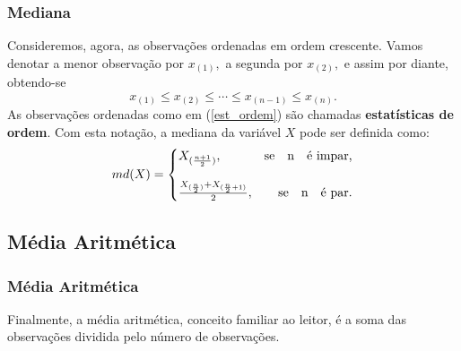 \documentclass[14pt,aspectratio=1610]{beamer}
\begin{document}
\begin{frame}{}
\frametitle{Mediana}
\begin{block}{}
\justifying
Consideremos, agora, as observações ordenadas em ordem crescente. Vamos denotar a
menor observação por $x_{(1)},$ a segunda por $x_{(2)},$ e assim por diante, obtendo-se
\begin{equation}\label{est_ordem}
x_{(1)}\leq x_{(2)}\leq \cdots \leq x_{(n-1)}\leq x_{(n)}.
\end{equation}
As observações ordenadas como em (\ref{est_ordem}) são chamadas {\bf estatísticas de ordem}. Com esta notação, a mediana da variável $X$ pode ser definida como:
\[
md(X)=\left\{
\setlength\arraycolsep{0pt}
\begin{array}{lr}
X_{(\frac{n+1}{2})},                                             &\quad \textrm{se}\quad $n$\quad \textrm{é impar,}\\
&\\
\frac{X_{(\frac{n}{2})}+X_{(\frac{n}{2}+1)}}{2},  &\quad \textrm{se}\quad $n$\quad \textrm{é par.}\\
\end{array}
\right.
\]
\end{block}
\end{frame}
\subsection{Média Aritmética}
\begin{frame}{}
\frametitle{Média Aritmética}
\begin{block}{}
\justifying
Finalmente, a média aritmética, conceito familiar ao leitor, é a soma das observações dividida pelo número de observações.
\end{block}
\end{frame}

\end{document}
